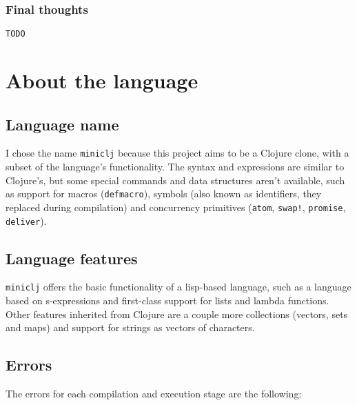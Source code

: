 \documentclass[11pt]{scrreprt}
\begin{document}
\subsection{Final thoughts}
\texttt{TODO}


\chapter{About the language}
\section{Language name}
I chose the name \texttt{miniclj} because this project aims to be a Clojure clone, with a subset of the language's functionality. The syntax and expressions are similar to Clojure's, but some special commands and data structures aren't available, such as support for macros (\texttt{defmacro}), symbols (also known as identifiers, they replaced during compilation) and concurrency primitives (\texttt{atom}, \texttt{swap!}, \texttt{promise}, \texttt{deliver}).

\section{Language features}
\texttt{miniclj} offers the basic functionality of a lisp-based language, such as a language based on s-expressions and first-class support for lists and lambda functions. Other features inherited from Clojure are a couple more collections (vectors, sets and maps) and support for strings as vectors of characters.

\section{Errors}
The errors for each compilation and execution stage are the following:
\end{document}
